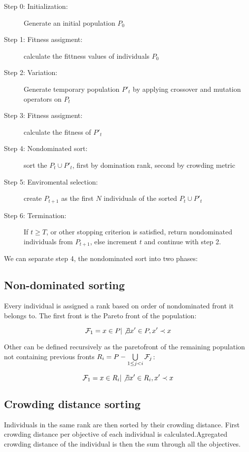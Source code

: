 \documentclass[12pt,oneside]{fithesis2}
\begin{document}
\begin{description}
	\item[Step 0: Initialization:] Generate an initial population $P_0$ 
	\item[Step 1: Fitness assigment:] calculate the fittness values of individuals $P_0$
	\item[Step 2: Variation:] Generate temporary population $P'_t$ by applying crossover and mutation operators on $P_t$
	\item[Step 3: Fitness assigment:] calculate the fitness of $P'_t$
	\item[Step 4: Nondominated sort:] sort the $P_t \cup P'_t$, first by domination rank, second by crowding metric
	\item[Step 5: Enviromental selection:] create $P_{t+1}$ as the first $N$ individuals of the sorted $P_t \cup P'_t$
	\item[Step 6: Termination:] If $t \geq T$, or other stopping criterion is satisfied, return nondominated individuals from $P_{t+1}$, else increment $t$ and continue with step 2.
\end{description}

We can separate step 4, the nondominated sort into two phases:

\subsection{Non-dominated sorting}
Every individual is assigned a rank based on order of nondominated front it belongs to. The first front is the Pareto front of the population:

$${\cal{F}}_1 = {x \in P | \not \exists x' \in P, x' \prec x} $$

Other can be defined recursively as the paretofront of the remaining population not containing previous fronts $R_i = P - \bigcup\limits_{1\leq j < i} {\cal{F}}_j$:

$${\cal{F}}_1 = {x \in R_i | \not \exists x' \in R_i, x' \prec x} $$

\subsection{Crowding distance sorting}

Individuals in the same rank are then sorted by their crowding distance. First crowding distance per objective of each individual is calculated.Agregated crowding distance of the individual is then the sum through all the objectives.
\end{document}
